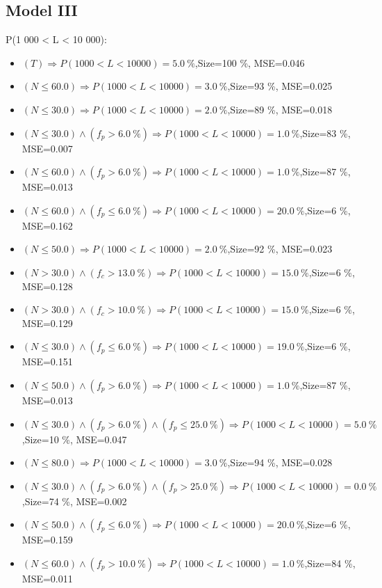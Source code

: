 \documentclass[numbered]{CSL}
\begin{document}
\subsection{Model III}
P(1 000 < L < 10 000):
\begin{itemize}
\item $(T) \Rightarrow P(1 000 < L < 10 000) = 5.0~\%$,\hfill Size=100 \%, MSE=0.046
\item $(N \leq 60.0) \Rightarrow P(1 000 < L < 10 000) = 3.0~\%$,\hfill Size=93 \%, MSE=0.025
\item $(N \leq 30.0) \Rightarrow P(1 000 < L < 10 000) = 2.0~\%$,\hfill Size=89 \%, MSE=0.018
\item $(N \leq 30.0) \land (f_p > 6.0~\%) \Rightarrow P(1 000 < L < 10 000) = 1.0~\%$,\hfill Size=83 \%, MSE=0.007
\item $(N \leq 60.0) \land (f_p > 6.0~\%) \Rightarrow P(1 000 < L < 10 000) = 1.0~\%$,\hfill Size=87 \%, MSE=0.013
\item $(N \leq 60.0) \land (f_p \leq 6.0~\%) \Rightarrow P(1 000 < L < 10 000) = 20.0~\%$,\hfill Size=6 \%, MSE=0.162
\item $(N \leq 50.0) \Rightarrow P(1 000 < L < 10 000) = 2.0~\%$,\hfill Size=92 \%, MSE=0.023
\item $(N > 30.0) \land (f_c > 13.0~\%) \Rightarrow P(1 000 < L < 10 000) = 15.0~\%$,\hfill Size=6 \%, MSE=0.128
\item $(N > 30.0) \land (f_c > 10.0~\%) \Rightarrow P(1 000 < L < 10 000) = 15.0~\%$,\hfill Size=6 \%, MSE=0.129
\item $(N \leq 30.0) \land (f_p \leq 6.0~\%) \Rightarrow P(1 000 < L < 10 000) = 19.0~\%$,\hfill Size=6 \%, MSE=0.151
\item $(N \leq 50.0) \land (f_p > 6.0~\%) \Rightarrow P(1 000 < L < 10 000) = 1.0~\%$,\hfill Size=87 \%, MSE=0.013
\item $(N \leq 30.0) \land (f_p > 6.0~\%) \land (f_p \leq 25.0~\%) \Rightarrow P(1 000 < L < 10 000) = 5.0~\%$,\hfill Size=10 \%, MSE=0.047
\item $(N \leq 80.0) \Rightarrow P(1 000 < L < 10 000) = 3.0~\%$,\hfill Size=94 \%, MSE=0.028
\item $(N \leq 30.0) \land (f_p > 6.0~\%) \land (f_p > 25.0~\%) \Rightarrow P(1 000 < L < 10 000) = 0.0~\%$,\hfill Size=74 \%, MSE=0.002
\item $(N \leq 50.0) \land (f_p \leq 6.0~\%) \Rightarrow P(1 000 < L < 10 000) = 20.0~\%$,\hfill Size=6 \%, MSE=0.159
\item $(N \leq 60.0) \land (f_p > 10.0~\%) \Rightarrow P(1 000 < L < 10 000) = 1.0~\%$,\hfill Size=84 \%, MSE=0.011

\end{itemize}
\end{document}
